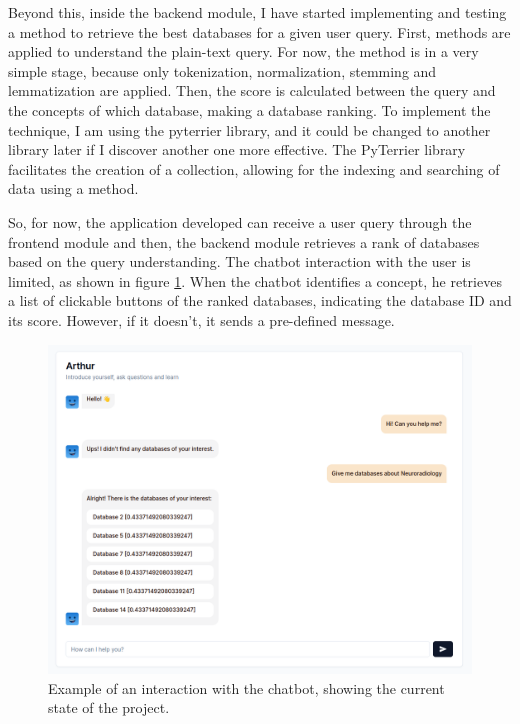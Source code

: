 Beyond this, inside the backend module, I have started implementing and testing a {\bm} method to retrieve the best databases for a given user query. First, {\nlp} methods are applied to understand the plain-text query. For now, the {\nlp} method is in a very simple stage, because only tokenization, normalization, stemming and lemmatization are applied. Then, the {\bm} score is calculated between the query and the concepts of which database, making a database ranking. To implement the {\ir} technique, I am using the pyterrier library, and it could be changed to another library later if I discover another one more effective. The PyTerrier library facilitates the creation of a collection, allowing for the indexing and searching of data using a {\bm} method.
 
So, for now, the application developed can receive a user query through the frontend module and then, the backend module retrieves a rank of databases based on the query understanding. The chatbot interaction with the user is limited, as shown in figure \ref{fig_interface}. When the chatbot identifies a concept, he retrieves a list of clickable buttons of the ranked databases, indicating the database ID and its {} score. However, if it doesn't, it sends a pre-defined message.

\begin{figure}[ht]
    \includegraphics[width=12cm]{figs/methodology/interface.png}
    \centering
    \caption{Example of an interaction with the chatbot, showing the current state of the project.}
    \label{fig_interface}
\end{figure}



